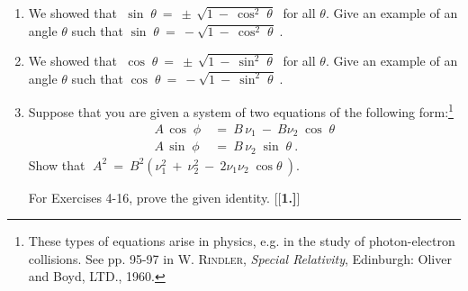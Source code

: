 \divider
\newpage
\startexercises\label{sec3dot1}
\vspace{5mm}
{\small
\begin{enumerate}[\bfseries 1.]
 \item We showed that $\;\sin\;\theta ~=~ \pm\,\sqrt{1 ~-~ \cos^2 \;\theta}\;$ for all
  $\theta$. Give an example of an angle $\theta$ such that
  $\sin\;\theta ~=~ -\sqrt{1 ~-~ \cos^2 \;\theta}\;$.
 \item We showed that $\;\cos\;\theta ~=~ \pm\,\sqrt{1 ~-~ \sin^2 \;\theta}\;$ for all
  $\theta$. Give an example of an angle $\theta$ such that
  $\cos\;\theta ~=~ -\sqrt{1 ~-~ \sin^2 \;\theta}\;$.
 \item Suppose that you are given a system of two equations of the following
  form:\footnote{These types of
  equations arise in physics, e.g. in the study of photon-electron collisions. See pp. 95-97 in
  \textsc{W. Rindler}, \emph{Special Relativity}, Edinburgh: Oliver and Boyd, LTD., 1960.}
 \begin{align*}
  A\,\cos\;\phi ~ &= ~ B\, \nu_1 ~-~ B\nu_2 \;\cos\;\theta\\
  A\,\sin\;\phi ~ &= ~ B\, \nu_2 \;\sin\;\theta ~.
 \end{align*}
 Show that $\;A ^2 ~=~ B^2 \left( \nu_1^2 ~+~ \nu_2^2 ~-~ 2\nu_1 \nu_2 \;\cos\theta\ \right)$.
\par\noindent For Exercises 4-16, prove the given identity.
[{[\bfseries 1.]}]
\end{enumerate}}
